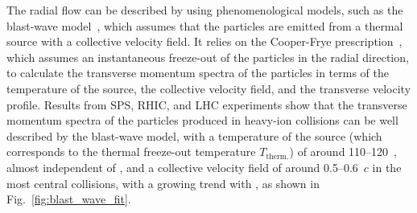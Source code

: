 The radial flow can be described by using phenomenological models, such as the blast-wave model~\cite{Schnedermann:1993ws}, which assumes that the particles are emitted from a thermal source with a collective velocity field. It relies on the Cooper-Frye prescription~\cite{Cooper:1974mv}, which assumes an instantaneous freeze-out of the particles in the radial direction, to calculate the transverse momentum spectra of the particles in terms of the temperature of the source, the collective velocity field, and the transverse velocity profile. Results from SPS, RHIC, and LHC experiments show that the transverse momentum spectra of the particles produced in heavy-ion collisions can be well described by the blast-wave model, with a temperature of the source (which corresponds to the thermal freeze-out temperature $T_\mathrm{therm.}$) of around 110--120~\mev, almost independent of \snn, and a collective velocity field of around 0.5--0.6~$c$ in the most central collisions, with a growing trend with \snn, as shown in Fig.~\ref{fig:blast_wave_fit}.

